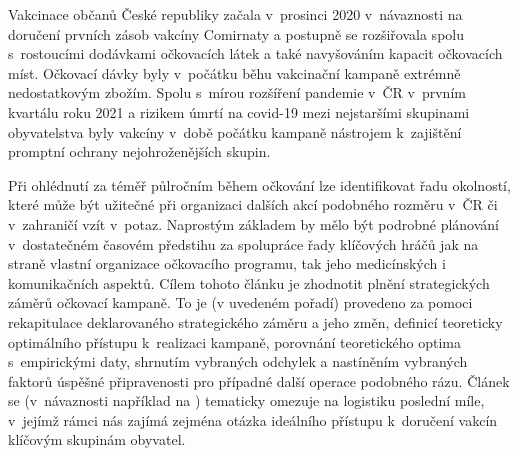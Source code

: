 Vakcinace občanů České republiky začala v~prosinci 2020 v~návaznosti na doručení prvních zásob vakcíny Comirnaty a postupně se rozšiřovala spolu s~rostoucími do\-dáv\-ka\-mi očkovacích látek a také navyšováním kapacit očkovacích míst. %
%
Očkovací dávky byly v~počátku běhu vakcinační kampaně extrémně nedostatkovým zbožím. Spolu s~mírou rozšíření pandemie v~ČR v~prvním kvartálu roku 2021 a rizikem úmrtí na covid-19 mezi nejstaršími skupinami obyvatelstva byly vakcíny v~době počátku kampaně nástrojem k~zajištění promptní ochrany nejohroženějších skupin. %

Při ohlédnutí za téměř půlročním během očkování lze identifikovat řadu okolností, které může být užitečné při organizaci dalších akcí podobného rozměru v~ČR či v~zahraničí vzít v~potaz. Naprostým základem by mělo být podrobné plánování v~dostatečném časovém předstihu za spolupráce řady klíčových hráčů jak na straně vlastní organizace očkovacího programu, tak jeho medicínských i komunikačních aspektů. 
%
Cílem tohoto článku je zhodnotit plnění strategických záměrů očkovací kampaně. %
To je (v uvedeném pořadí) provedeno za pomoci rekapitulace deklarovaného strategického záměru a jeho změn, definicí teoreticky optimálního přístupu k~realizaci kampaně, porovnání teoretického optima s~empirickými daty, shrnutím vybraných odchylek a nastíněním vybraných faktorů úspěšné připravenosti pro případné další operace podobného rázu.
%
Článek se (v~návaznosti například na \cite{lastmile}) tematicky omezuje na logistiku poslední míle, v~jejímž rámci nás zajímá zejména otázka ideálního přístupu k~doručení vakcín klíčovým skupinám obyvatel.


